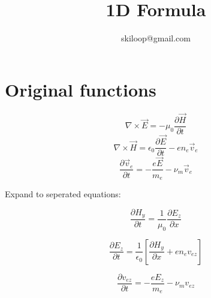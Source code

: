 \documentclass[a4paper,10pt]{article}
\title{1D Formula}
\author{skiloop@gmail.com}
\begin{document}
\maketitle
\section{Original functions}
\begin{equation}
\nabla \times \vec{E}=-\mu_{0}\frac{\partial \vec{H}}{\partial t}
\end{equation}
\begin{equation}
\nabla \times \vec{H}=\epsilon_{0}\frac{\partial \vec{E}}{\partial t}-e n_{e}\vec{v}_{e}
\end{equation}
\begin{equation}
\frac{\partial\vec{v}_{e}}{\partial t}=-\frac{e\vec{E}}{m_{e}}-\nu_{m}\vec{v}_{e}
\end{equation}

Expand to seperated equations:

\begin{equation}\label{eqHy}
\frac{\partial H_{y}}{\partial t}=\frac{1}{\mu_{0}}\frac{\partial E_{z}}{\partial x}
\end{equation}


\begin{equation}\label{eqEz}
\frac{\partial E_{z}}{\partial t}=\frac{1}{\epsilon_{0}}\left[\frac{\partial H_{y}}{\partial x}+e n_{e}v_{ez}\right]
\end{equation}


\begin{equation}\label{eqVz}
\frac{\partial v_{ez}}{\partial t}=-\frac{e E_{z}}{m_{e}}-\nu_{m}v_{ez}
\end{equation}
\end{document}
